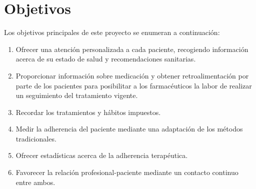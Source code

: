 \section{Objetivos}
Los objetivos principales de este proyecto se enumeran a continuación:
\begin{enumerate}
	\item Ofrecer una atención personalizada a cada paciente, recogiendo información acerca de su estado de salud y recomendaciones sanitarias.
	
	\item Proporcionar información sobre medicación y obtener retroalimentación por parte de los pacientes para posibilitar a los farmacéuticos la labor de realizar un seguimiento del tratamiento vigente.
	
	\item Recordar los tratamientos y hábitos impuestos.
	
	\item Medir la adherencia del paciente mediante una adaptación de los métodos tradicionales.
	
	\item Ofrecer estadísticas acerca de la adherencia terapéutica.
	
	\item Favorecer la relación profesional-paciente mediante un contacto continuo entre ambos.
\end{enumerate}
	


